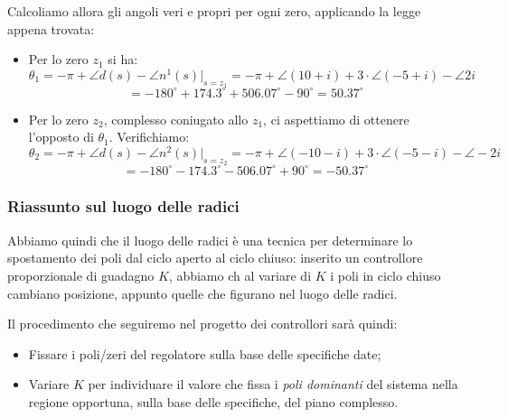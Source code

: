 \documentclass[a4paper,11pt]{article}
\begin{document}
\begin{enumerate}
		Calcoliamo allora gli angoli veri e propri per ogni zero, applicando la legge appena trovata:
		\begin{itemize}
			\item Per lo zero $z_1$ si ha:
				$$
					\theta_1 = - \pi + \angle d(s) - \angle n^1(s) \Big|_{s = z_1} = -\pi + \angle(10 + i) + 3 \cdot \angle (-5 + i) - \angle  2i 
				$$
				$$
				= -180^\circ + 174.3^\circ + 506.07^\circ -90^\circ = 50.37^\circ
				$$
			\item Per lo zero $z_2$, complesso coniugato allo $z_1$, ci aspettiamo di ottenere l'opposto di $\theta_1$. Verifichiamo:
				$$
					\theta_2 = - \pi + \angle d(s) - \angle n^2(s) \Big|_{s = z_2} = -\pi + \angle(-10 - i) + 3 \cdot \angle (-5 - i) - \angle -2i 
				$$
				$$
				= -180^\circ - 174.3^\circ - 506.07^\circ +90^\circ = -50.37^\circ
				$$
		\end{itemize}

\end{enumerate}

\subsubsection{Riassunto sul luogo delle radici}
Abbiamo quindi che il luogo delle radici è una tecnica per determinare lo spostamento dei poli dal ciclo aperto al ciclo chiuso: inserito un controllore proporzionale di guadagno $K$, abbiamo ch al variare di $K$ i poli in ciclo chiuso cambiano posizione, appunto quelle che figurano nel luogo delle radici.

Il procedimento che seguiremo nel progetto dei controllori sarà quindi:
\begin{itemize}
	\item Fissare i poli/zeri del regolatore sulla base delle specifiche date;
	\item Variare $K$ per individuare il valore che fissa i \textit{poli dominanti} del sistema nella regione opportuna, sulla base delle specifiche, del piano complesso.
\end{itemize}
\end{document}
